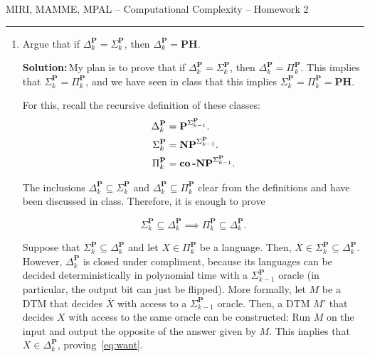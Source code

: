 \documentclass{amsart}
\theoremstyle{plain}
\theoremstyle{definition}
\newcommand{\np}{\textbf{NP}}
\newcommand{\p}{\textbf{P}}
\newcommand{\conp}{\textbf{co\,-NP}}
\newcommand{\ph}{\textbf{PH}}
\newcommand{\sol}{\textbf{Solution:\,}}
\newcommand{\ov}[1]{\overline{#1}}
\begin{document}
    {\Large MIRI, MAMME, MPAL -- Computational Complexity -- Homework 2}

    \vspace{0.5cm}

    \hrule

    \vspace{0.5cm}

    \begin{enumerate}[label=\textbf{Exercise \arabic*:}, leftmargin=0cm, labelwidth=-0.2cm, align=left]

        \item
            Argue that if $\Delta_k^\p = \Sigma_k^\p$, then $\Delta_k^\p=$\ph\@.

            \sol My plan is to prove that if $\Delta_k^\p = \Sigma_k^\p$, then $\Delta_k^\p=\Pi_k^\p$.
            This implies that $\Sigma_k^\p = \Pi_k^\p$, and we have seen in class that
            this implies $\Sigma_k^\p = \Pi_k^\p = \ph$.

            For this, recall the recursive definition of these classes:
            \begin{align*}
                \Delta_k^\p &= \p^{\Sigma_{k-1}^\p}. \\
                \Sigma_k^\p &= \np^{\Sigma_{k-1}^\p}. \\
                \Pi_k^\p &= \conp^{\Sigma_{k-1}^\p}.
            \end{align*}

            The inclusions $\Delta_k^\p \subseteq \Sigma_k^\p$ and $\Delta_k^\p \subseteq \Pi_k^\p$ clear
            from the definitions and have been discussed in class.
            Therefore, it is enough to prove

            \begin{equation}
                \Sigma_k^\p \subseteq \Delta_k^\p \implies \Pi_k^\p \subseteq \Delta_k^\p.\label{eq:want}
            \end{equation}

            Suppose that $\Sigma_k^\p \subseteq \Delta_k^\p$ and let $X \in \Pi_k^\p$ be a language.
            Then, $\ov{X} \in \Sigma_k^\p \subseteq \Delta_k^\p$.
            However, $\Delta_k^\p$ is closed under compliment, because its languages can be decided
            deterministically in polynomial time with a $\Sigma_{k-1}^\p$ oracle
            (in particular, the output bit can just be flipped).
            More formally, let $M$ be a DTM that decides $\ov{X}$ with access to a $\Sigma_{k-1}^\p$ oracle.
            Then, a DTM $M'$ that decides $X$ with access to the same oracle can be constructed:
            Run $M$ on the input and output the opposite of the answer given by $M$.
            This implies that $X \in \Delta_k^\p$, proving~\eqref{eq:want}.


\end{enumerate}
\end{document}
